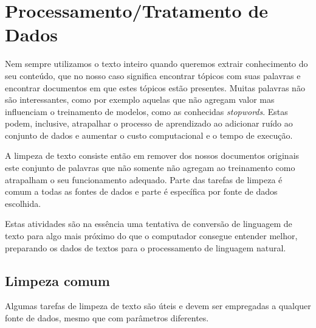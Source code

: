 \section{Processamento/Tratamento de Dados}

Nem sempre utilizamos o texto inteiro quando queremos extrair conhecimento do seu conteúdo, que no nosso caso significa encontrar tópicos com suas palavras e 
encontrar documentos em que estes tópicos estão presentes. Muitas palavras não são interessantes, como por exemplo aquelas que não agregam valor 
mas influenciam o treinamento de modelos, como as conhecidas \textit{stopwords}. Estas podem, inclusive, atrapalhar o processo de aprendizado 
ao adicionar ruído ao conjunto de dados e aumentar o custo computacional e o tempo de execução.

A limpeza de texto consiste então em remover dos nossos documentos originais este conjunto de palavras que não somente não agregam ao treinamento como atrapalham 
o seu funcionamento adequado. Parte das tarefas de limpeza é comum a todas as fontes de dados e parte é específica por fonte de dados escolhida.

Estas atividades são na essência uma tentativa de conversão de linguagem de texto para algo mais próximo do que o computador consegue entender melhor,
preparando os dados de textos para o processamento de linguagem natural.

\subsection{Limpeza comum}

Algumas tarefas de limpeza de texto são úteis e devem ser empregadas a qualquer fonte de dados, mesmo que com parâmetros diferentes.

